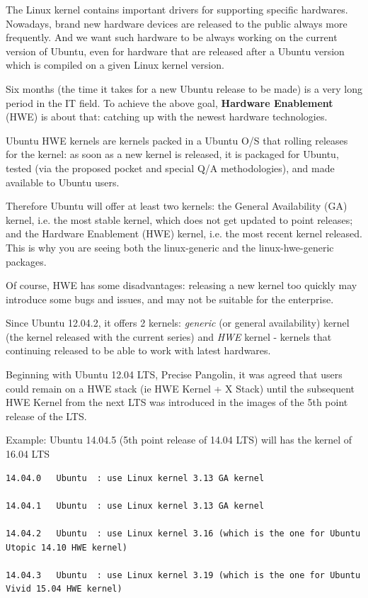 \begin{mdframed}

The Linux kernel contains important drivers for supporting specific hardwares.
Nowadays, brand new hardware devices are released to the public always more
frequently. And we want such hardware to be always working on the current
version of Ubuntu, even for hardware that are released after a Ubuntu version
which is compiled on a given Linux kernel version.

Six months (the time it takes for a new Ubuntu release to be made) is a very
long period in the IT field. To achieve the above goal, {\bf Hardware
Enablement} (HWE) is about that: catching up with the newest hardware
technologies.

Ubuntu HWE kernels are kernels packed in a Ubuntu O/S that rolling releases for
the kernel: as soon as a new kernel is released, it is packaged for Ubuntu,
tested (via the proposed pocket and special Q/A methodologies), and made
available to Ubuntu users.

Therefore Ubuntu will offer at least two kernels: the General Availability (GA)
kernel, i.e. the most stable kernel, which does not get updated to point
releases; and the Hardware Enablement (HWE) kernel, i.e. the most recent kernel
released. This is why you are seeing both the linux-generic and the
linux-hwe-generic packages.

Of course, HWE has some disadvantages: releasing a new kernel too
quickly may introduce some bugs and issues, and may not be suitable for the
enterprise.

 
\end{mdframed}


Since Ubuntu 12.04.2, it offers 2 kernels: {\it generic} (or general
availability) kernel (the kernel released with the current series) and {\it HWE}
kernel - kernels that continuing released to be able to work with latest
hardwares.

Beginning with Ubuntu 12.04 LTS, Precise Pangolin, it was agreed that users
could remain on a HWE stack (ie HWE Kernel + X Stack) until the subsequent HWE
Kernel from the next LTS was introduced in the images of the 5th point release
of the LTS.

Example: Ubuntu 14.04.5 (5th point release of 14.04 LTS) will has the kernel of 16.04 LTS
\begin{verbatim}
14.04.0   Ubuntu  : use Linux kernel 3.13 GA kernel

14.04.1   Ubuntu  : use Linux kernel 3.13 GA kernel

14.04.2   Ubuntu  : use Linux kernel 3.16 (which is the one for Ubuntu Utopic 14.10 HWE kernel)

14.04.3   Ubuntu  : use Linux kernel 3.19 (which is the one for Ubuntu Vivid 15.04 HWE kernel)
\end{verbatim}



